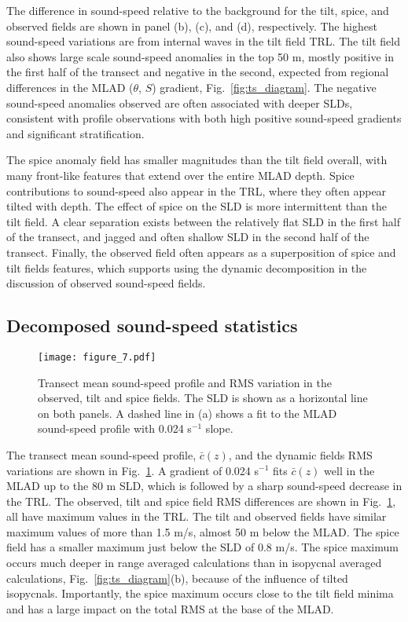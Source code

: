 \documentclass[preprint,NumberedRefs]{JASA}
\begin{document}
The difference in sound-speed relative to the background for the tilt, spice, and observed fields are shown in panel (b), (c), and (d), respectively. The highest sound-speed variations are from internal waves in the tilt field TRL. The tilt field also shows large scale sound-speed anomalies in the top 50 m, mostly positive in the first half of the transect and negative in the second, expected from regional differences in the MLAD ($\theta$, $S$) gradient, Fig.~\ref{fig:ts_diagram}. The negative sound-speed anomalies observed are often associated with deeper SLDs, consistent with profile observations with both high positive sound-speed gradients and significant stratification.\cite{colosi2020observations}

The spice anomaly field has smaller magnitudes than the tilt field overall, with many front-like features that extend over the entire MLAD depth. Spice contributions to sound-speed also appear in the TRL, where they often appear tilted with depth. The effect of spice on the SLD is more intermittent than the tilt field. A clear separation exists between the relatively flat SLD in the first half of the transect, and jagged and often shallow SLD in the second half of the transect. Finally, the observed field often appears as a superposition of spice and tilt fields features, which supports using the dynamic decomposition in the discussion of observed sound-speed fields.

\subsection{Decomposed sound-speed statistics}\label{ssec:decomp}
\begin{figure}
\texttt{[image: figure\_7.pdf]}
        \caption{\label{fig:c_rms}{Transect mean sound-speed profile and RMS variation in the observed, tilt and spice fields. The SLD is shown as a horizontal line on both panels. A dashed line in (a) shows a fit to the MLAD sound-speed profile with 0.024 s$^{-1}$ slope.}}
\end{figure}

The transect mean sound-speed profile, $\bar{c}(z)$, and the dynamic fields RMS variations are shown in Fig.~\ref{fig:c_rms}. A gradient of 0.024 s$^{-1}$ fits $\bar{c}(z)$ well in the MLAD up to the 80 m SLD, which is followed by a sharp sound-speed decrease in the TRL. The observed, tilt and spice field RMS differences are shown in Fig.~\ref{fig:c_rms}, all have maximum values in the TRL. The tilt and observed fields have similar maximum values of more than 1.5 m/s, almost 50 m below the MLAD. The spice field has a smaller maximum just below the SLD of 0.8 m/s. The spice maximum occurs much deeper in range averaged calculations than in isopycnal averaged calculations, Fig.~\ref{fig:ts_diagram}(b), because of the influence of tilted isopycnals.\citep{ferrari2000} Importantly, the spice maximum occurs close to the tilt field minima and has a large impact on the total RMS at the base of the MLAD.
\end{document}
